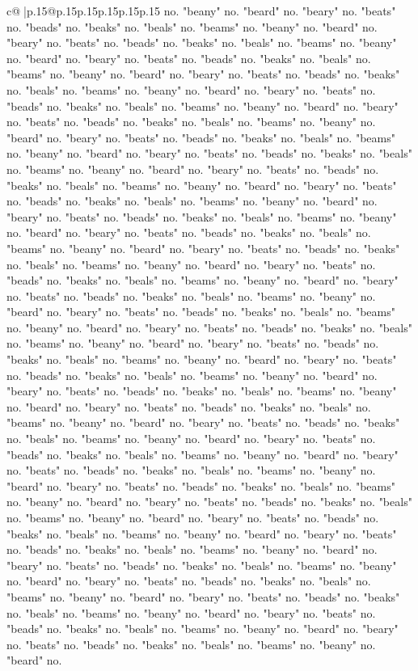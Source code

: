 \documentclass{article}
\begin{document}
{\begin{supertabular}{c@{$\;$}|p{.15\linewidth}@{}p{.15\linewidth}p{.15\linewidth}p{.15\linewidth}p{.15\linewidth}p{.15\linewidth}}
{{{no. "beany" no. "beard" no. "beary" no. "beats" no. "beads" no. "beaks" no. "beals" no. "beams" no. "beany" no. "beard" no. "beary" no. "beats" no. "beads" no. "beaks" no. "beals" no. "beams" no. "beany" no. "beard" no. "beary" no. "beats" no. "beads" no. "beaks" no. "beals" no. "beams" no. "beany" no. "beard" no. "beary" no. "beats" no. "beads" no. "beaks" no. "beals" no. "beams" no. "beany" no. "beard" no. "beary" no. "beats" no. "beads" no. "beaks" no. "beals" no. "beams" no. "beany" no. "beard" no. "beary" no. "beats" no. "beads" no. "beaks" no. "beals" no. "beams" no. "beany" no. "beard" no. "beary" no. "beats" no. "beads" no. "beaks" no. "beals" no. "beams" no. "beany" no. "beard" no. "beary" no. "beats" no. "beads" no. "beaks" no. "beals" no. "beams" no. "beany" no. "beard" no. "beary" no. "beats" no. "beads" no. "beaks" no. "beals" no. "beams" no. "beany" no. "beard" no. "beary" no. "beats" no. "beads" no. "beaks" no. "beals" no. "beams" no. "beany" no. "beard" no. "beary" no. "beats" no. "beads" no. "beaks" no. "beals" no. "beams" no. "beany" no. "beard" no. "beary" no. "beats" no. "beads" no. "beaks" no. "beals" no. "beams" no. "beany" no. "beard" no. "beary" no. "beats" no. "beads" no. "beaks" no. "beals" no. "beams" no. "beany" no. "beard" no. "beary" no. "beats" no. "beads" no. "beaks" no. "beals" no. "beams" no. "beany" no. "beard" no. "beary" no. "beats" no. "beads" no. "beaks" no. "beals" no. "beams" no. "beany" no. "beard" no. "beary" no. "beats" no. "beads" no. "beaks" no. "beals" no. "beams" no. "beany" no. "beard" no. "beary" no. "beats" no. "beads" no. "beaks" no. "beals" no. "beams" no. "beany" no. "beard" no. "beary" no. "beats" no. "beads" no. "beaks" no. "beals" no. "beams" no. "beany" no. "beard" no. "beary" no. "beats" no. "beads" no. "beaks" no. "beals" no. "beams" no. "beany" no. "beard" no. "beary" no. "beats" no. "beads" no. "beaks" no. "beals" no. "beams" no. "beany" no. "beard" no. "beary" no. "beats" no. "beads" no. "beaks" no. "beals" no. "beams" no. "beany" no. "beard" no. "beary" no. "beats" no. "beads" no. "beaks" no. "beals" no. "beams" no. "beany" no. "beard" no. "beary" no. "beats" no. "beads" no. "beaks" no. "beals" no. "beams" no. "beany" no. "beard" no. "beary" no. "beats" no. "beads" no. "beaks" no. "beals" no. "beams" no. "beany" no. "beard" no. "beary" no. "beats" no. "beads" no. "beaks" no. "beals" no. "beams" no. "beany" no. "beard" no. "beary" no. "beats" no. "beads" no. "beaks" no. "beals" no. "beams" no. "beany" no. "beard" no. "beary" no. "beats" no. "beads" no. "beaks" no. "beals" no. "beams" no. "beany" no. "beard" no. "beary" no. "beats" no. "beads" no. "beaks" no. "beals" no. "beams" no. "beany" no. "beard" no. "beary" no. "beats" no. "beads" no. "beaks" no. "beals" no. "beams" no. "beany" no. "beard" no. "beary" no. "beats" no. "beads" no. "beaks" no. "beals" no. "beams" no. "beany" no. "beard" no. "beary" no. "beats" no. "beads" no. "beaks" no. "beals" no. "beams" no. "beany" no. "beard" no. "beary" no. "beats" no. "beads" no. "beaks" no. "beals" no. "beams" no. "beany" no. "beard" no. "beary" no. "beats" no. "beads" no. "beaks" no. "beals" no. "beams" no. "beany" no. "beard" no. }}}
\end{supertabular}}
\end{document}
